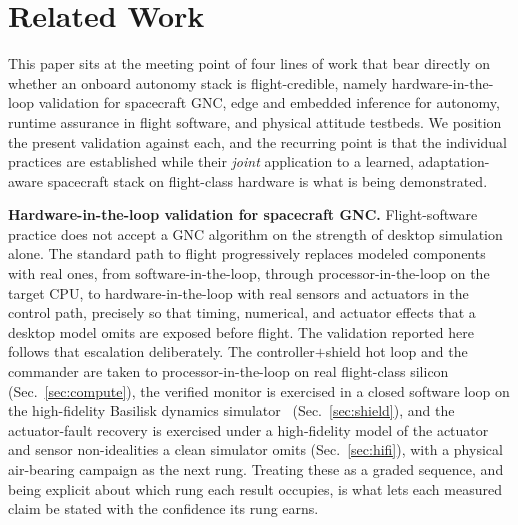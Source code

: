 \documentclass[journal]{IEEEtran}
\begin{document}
\section{Related Work}
This paper sits at the meeting point of four lines of work that bear directly on whether an
onboard autonomy stack is flight-credible, namely hardware-in-the-loop validation for spacecraft
GNC, edge and embedded inference for autonomy, runtime assurance in flight software, and physical
attitude testbeds. We position the present validation against each, and the recurring point is
that the individual practices are established while their \emph{joint} application to a learned,
adaptation-aware spacecraft stack on flight-class hardware is what is being demonstrated.

\noindent\textbf{Hardware-in-the-loop validation for spacecraft GNC.} Flight-software practice
does not accept a GNC algorithm on the strength of desktop simulation alone. The standard path to
flight progressively replaces modeled components with real ones, from software-in-the-loop,
through processor-in-the-loop on the target CPU, to hardware-in-the-loop with real sensors and
actuators in the control path, precisely so that timing, numerical, and actuator effects that a
desktop model omits are exposed before flight. The validation reported here follows that
escalation deliberately. The controller$+$shield hot loop and the commander are taken to
processor-in-the-loop on real flight-class silicon (Sec.~\ref{sec:compute}), the verified monitor
is exercised in a closed software loop on the high-fidelity Basilisk dynamics
simulator~\cite{Basilisk} (Sec.~\ref{sec:shield}), and the actuator-fault recovery is exercised
under a high-fidelity model of the actuator and sensor non-idealities a clean simulator omits
(Sec.~\ref{sec:hifi}), with a physical air-bearing campaign as the next rung. Treating these as a
graded sequence, and being explicit about which rung each result occupies, is what lets each
measured claim be stated with the confidence its rung earns.
\end{document}

